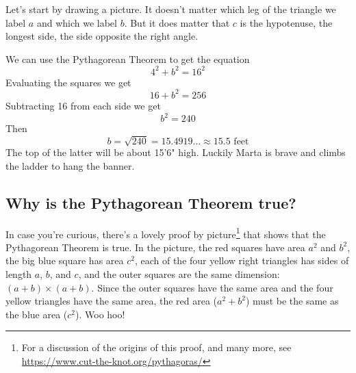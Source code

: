 Let's start by drawing a picture.  It doesn't matter which leg of the triangle we label $a$ and which we label $b$.  But it does matter that $c$ is the hypotenuse, the longest side, the side opposite the right angle.

 \begin{center}
 \end{center}
We can use the Pythagorean Theorem to get the equation
$$4^2+b^2=16^2$$
Evaluating the squares we get
$$16+b^2 = 256$$
Subtracting 16 from each side we get
$$b^2=240$$
Then
$$b=\sqrt{240} =15.4919\ldots \approx 15.5 \text{ feet}$$
The top of the latter will be about 15'6" high.  Luckily Marta is brave and climbs the ladder to hang the banner.

\subsection*{Why is the Pythagorean Theorem true?}

In case you're curious, there's a lovely proof by picture\footnote{For a discussion of the origins of this proof, and many more, see \url{https://www.cut-the-knot.org/pythagoras/}} that shows that the Pythagorean Theorem is true.  In the picture, the red squares have area $a^2$ and $b^2$, the big blue square has area $c^2$, each of the four yellow right triangles has sides of length $a$, $b$, and $c$, and the outer squares are the same dimension: $(a+b) \times (a+b)$.  Since the outer squares have the same area and the four yellow triangles have the same area, the red area ($a^2+b^2$) must be the same as the blue area ($c^2$).  Woo hoo!

